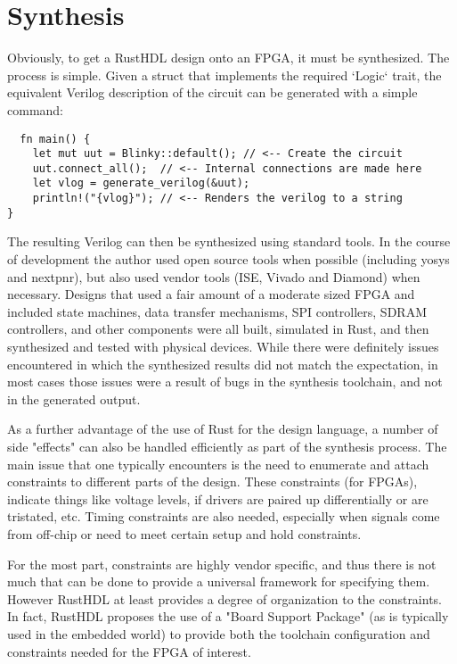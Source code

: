 \documentclass[conference]{IEEEtran}
\begin{document}
\section{Synthesis}

Obviously, to get a RustHDL design onto an FPGA, it must be synthesized.  The process is simple.  Given a struct that
implements the required `Logic` trait, the equivalent Verilog description of the circuit can be generated with a simple
command:

\begin{verbatim}
  fn main() {
    let mut uut = Blinky::default(); // <-- Create the circuit
    uut.connect_all();  // <-- Internal connections are made here
    let vlog = generate_verilog(&uut);
    println!("{vlog}"); // <-- Renders the verilog to a string
}
\end{verbatim}

The resulting Verilog can then be synthesized using standard tools.  In the course of development the author used 
open source tools when possible (including yosys and nextpnr), but also used vendor tools (ISE, Vivado and Diamond)
when necessary.  Designs that used a fair amount of a moderate sized FPGA and included state machines, data transfer 
mechanisms, SPI controllers, SDRAM controllers, and other components were all built, simulated in Rust, and then
synthesized and tested with physical devices.  While there were definitely issues encountered in which the synthesized 
results did not match the expectation, in most cases those issues were a result of bugs in the synthesis toolchain, and not
in the generated output.

As a further advantage of the use of Rust for the design language, a number of side "effects" can also be handled 
efficiently as part of the synthesis process.  The main issue that one typically encounters is the need to enumerate
and attach constraints to different parts of the design.  These constraints (for FPGAs), indicate things like 
voltage levels, if drivers are paired up differentially or are tristated, etc.  Timing constraints are also needed,
especially when signals come from off-chip or need to meet certain setup and hold constraints.  

For the most part, constraints are highly vendor specific, and thus there is not much that can be done to provide
a universal framework for specifying them.  However RustHDL at least provides a degree of organization to the constraints.
In fact, RustHDL proposes the use of a "Board Support Package" (as is typically used in the embedded world) to provide 
both the toolchain configuration and constraints needed for the FPGA of interest.  
\end{document}
